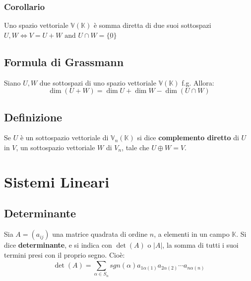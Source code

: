 \documentclass{article}
\newcommand{\V}{\mathbb{V} (\mathbb{K})}
\newcommand{\Vx}[1]{\mathbb{V}_#1 (\mathbb{K})}
\newcommand{\ah}{\alpha}
\begin{document}
\subsubsection{Corollario}
Uno spazio vettoriale $\V$ è somma diretta di due suoi sottospazi $U, W \iff{V} = U+W \text{ and } U \cap{W} = \{\underbar{0}\}$

\subsection{Formula di Grassmann}
Siano $U, W$ due sottospazi di uno spazio vettoriale $\V$ f.g. Allora:
\[
    \dim(U+W) = \dim U + \dim W - \dim(U\cap W)
\]

\subsection{Definizione}
Se $U$ è un sottospazio vettoriale di $\Vx{n}$ si dice \textbf{complemento diretto} di $U$ in $V$, un sottospazio vettoriale $W$ di $V_n$, tale che $U\oplus W = V$.

\section{Sistemi Lineari}
\subsection{Determinante}
Sia $A = (a_{ij})$ una matrice quadrata di ordine $n$, a elementi in un campo $\mathbb K$. Si dice \textbf{determinante}, e si indica con $\det(A)$ o $|A|$, la somma di tutti i suoi termini presi con il proprio segno. Cioè:
\[
    \det(A) = \sum_{\ah\in S_n}^{}sgn(\ah)a_{1\ah(1)}a_{2\ah(2)}\cdots a_{n\ah(n)}
\]
\end{document}
